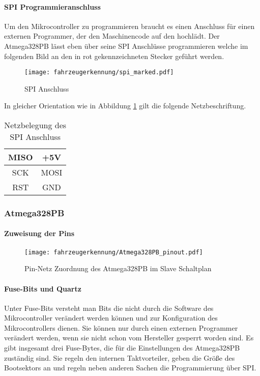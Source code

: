 \paragraph{SPI Programmieranschluss}\mbox{} 

Um den Mikrocontroller zu programmieren braucht es einen Anschluss für einen externen Programmer, der den Maschinencode auf den hochlädt. Der Atmega328PB lässt eben über seine SPI Anschlüsse programmieren welche im folgenden Bild
an den in rot gekennzeichneten Stecker geführt werden. 

\begin{figure}[H]
    \centering
    \texttt{[image: fahrzeugerkennung/spi\_marked.pdf]}
    \caption{SPI Anschluss}
    \label{fig:slave_left}
\end{figure}

In gleicher Orientation wie in Abbildung \ref{fig:slave_left} gilt die folgende Netzbeschriftung.

\begin{table}[H]
    \centering
    \begin{tabular}{|c|c|}
        \hline
        MISO & +5V  \\ \hline
        SCK  & MOSI \\ \hline
        RST  & GND  \\ \hline
    \end{tabular}
    \caption{Netzbelegung des SPI Anschluss}
\end{table}

\subsubsection{Atmega328PB}
\paragraph{Zuweisung der Pins}\mbox{} 

\begin{figure}[H]
    \centering
    \texttt{[image: fahrzeugerkennung/Atmega328PB\_pinout.pdf]}
    \caption{Pin-Netz Zuordnung des Atmega328PB im Slave Schaltplan}
\end{figure}

\paragraph{Fuse-Bits und Quartz}\mbox{} 

Unter Fuse-Bits versteht man Bits die nicht durch die Software des Mikrocontroller verändert werden können und zur Konfiguration des Mikrocontrollers dienen. Sie können nur durch einen externen Programmer verändert werden, 
wenn sie nicht schon vom Hersteller gesperrt worden sind. Es gibt insgesamt drei Fuse-Bytes, die für die Einstellungen des Atmega328PB zuständig sind. Sie regeln den internen Taktvorteiler, geben die Größe des Bootsektors an und
regeln neben anderen Sachen die Programmierung über SPI.

